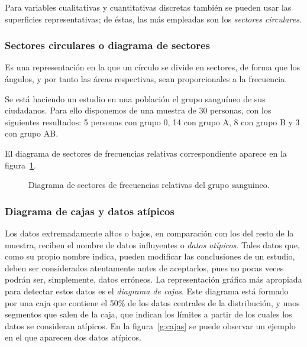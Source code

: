 Para variables cualitativas y cuantitativas discretas también se pueden usar las superficies representativas; de éstas, las más empleadas son los \emph{sectores circulares}.


\subsubsection{Sectores circulares o diagrama de sectores}

Es una representación en la que un círculo se divide en sectores, de forma que los ángulos, y por tanto las áreas respectivas, sean proporcionales a la frecuencia.

\begin{ejemplo}
Se está haciendo un estudio en una población el grupo sanguíneo de sus ciudadanos. Para ello disponemos de una muestra de 30 personas, con los siguientes resultados: 5 personas con grupo 0, 14 con grupo A, 8 con grupo B y  3 con grupo AB.

El diagrama de sectores de frecuencias relativas correspondiente aparece en la figura~\ref{g:diagramasectoresgruposanguineo}.

\begin{figure}[h!]
\centering
\scalebox{0.7}{}
\caption{Diagrama de sectores de frecuencias relativas del grupo sanguineo.}
\label{g:diagramasectoresgruposanguineo}
\end{figure}
\end{ejemplo}


\subsubsection{Diagrama de cajas y datos atípicos}
Los datos extremadamente altos o bajos, en comparación con los del resto de la muestra, reciben el nombre de datos influyentes o \emph{datos atípicos}.
Tales datos que, como su propio nombre indica, pueden modificar las conclusiones de un estudio, deben ser considerados atentamente antes de aceptarlos, pues no pocas veces podrán ser, simplemente, datos erróneos. La representación gráfica más apropiada para detectar estos datos es el \emph{diagrama de cajas}.
Este diagrama está formado por una caja que contiene el 50\% de los datos centrales de la distribución, y unos segmentos que salen de la caja, que indican los límites a partir de los cuales los
datos se consideran atípicos.
En la figura~\ref{g:cajas} se puede observar un ejemplo en el que aparecen dos datos atípicos.

